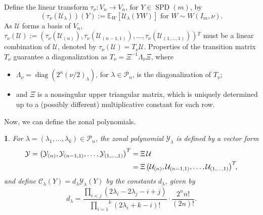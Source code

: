 \documentclass[smallextended]{svjour3}
\newtheorem{defn}[thm]{\protect\definitionname}
\DeclareMathOperator{\diag}{diag}
\newcommand{\SPD}{\operatorname{SPD}}
\providecommand{\definitionname}{Definition}
\begin{document}
\noindent
Define the linear transform $\tau_{\nu}\colon V_{n}\longrightarrow V_{n}$,
for $Y\in \SPD(m)$, by
\[
  (\tau_{\nu}(\mathcal{U}_{\lambda}))(Y) :=
  \mathbb{E}_{W}[\mathcal{U}_{\lambda}(YW)]\text{ for }W\sim W(I_m,\nu).
\]
As $\mathcal{U}$ forms a basis of $V_{n}$, $\tau_{\nu}(\mathcal{U}):=\left(\tau_{\nu}(\mathcal{U}_{(n)}),\tau_{\nu}(\mathcal{U}_{(n-1,1)}),\ldots,\tau_{\nu}(\mathcal{U}_{(1,\ldots,1)})\right){}^{\!T}$
must be a linear combination of $\mathcal{U}$,
denoted by $\tau_{\nu}(\mathcal{U})=T_{\nu}\mathcal{U}$. 
Properties of the transition matrix $T_{\nu}$ guarantee a diagonalization as $T_{\nu}=\Xi^{-1}\Lambda_{\nu}\Xi$, where 
\begin{itemize}
\item $\Lambda_{\nu}=\diag(2^{n}(\nu/2)_{\lambda})$, for $\lambda\in\mathcal{P}_n$, is the diagonalization of $T_\nu$; 
\item and $\Xi$ is a nonsingular upper triangular matrix, which is uniquely
determined up to a (possibly different) multiplicative constant for
each row.
\end{itemize} 
Now, we can define the zonal polynomials.
\begin{defn}
For $\lambda=(\lambda_1,\ldots,\lambda_k)\in\mathcal{P}_{n}$, the zonal polynomial $\mathcal{Y}_{\lambda}$
is defined by a vector form
\begin{align}
\mathcal{Y}=\left(\mathcal{Y}_{(n)}, \mathcal{Y}_{(n-1,1)}, \ldots, 
\mathcal{Y}_{(1,\ldots,1)}\right)^T
  &= \Xi\,\mathcal{U} \notag \\ 
  &= \Xi\left(\mathcal{U}_{(n)}, \mathcal{U}_{(n-1,1)}, \ldots, \mathcal{U}_{(1,\ldots,1)}
\right)^T\!\!, \label{eq:ZonalY}
\end{align}
and define $\mathcal{C}_{\lambda}(Y)=d_{\lambda}\mathcal{Y}_{\lambda}(Y)$ by the constants $d_\lambda$, given by
\[
  d_{\lambda}=\frac{\underset{i<j}{\prod}(2\lambda_{i}-2\lambda_{j}-i+j)}{\overset{k}{\underset{i=1}{\prod}}(2\lambda_{i}+k-i)!}
  \cdot\frac{2^{n}n!}{(2n)!}.
\]
\end{defn}
\end{document}

